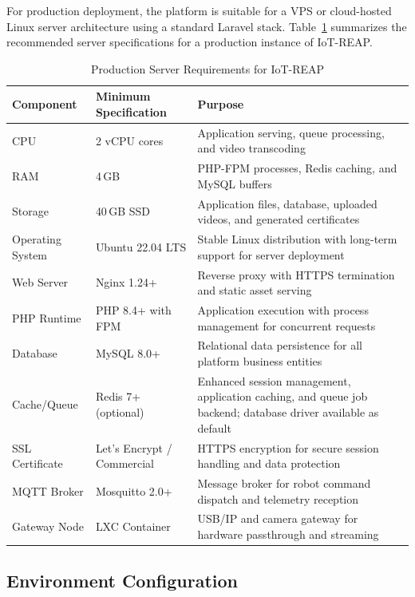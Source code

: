 For production deployment, the platform is suitable for a VPS or cloud-hosted Linux server architecture using a standard Laravel stack. Table~\ref{tab:production-requirements} summarizes the recommended server specifications for a production instance of IoT-REAP.

\begin{table}[H]
\centering
\caption{Production Server Requirements for IoT-REAP}
\label{tab:production-requirements}
\begin{tabular}{|p{4cm}|p{4cm}|p{6.5cm}|}
\hline
\textbf{Component} & \textbf{Minimum Specification} & \textbf{Purpose} \\
\hline
CPU & 2 vCPU cores & Application serving, queue processing, and video transcoding \\
\hline
RAM & 4\,GB & PHP-FPM processes, Redis caching, and MySQL buffers \\
\hline
Storage & 40\,GB SSD & Application files, database, uploaded videos, and generated certificates \\
\hline
Operating System & Ubuntu 22.04 LTS & Stable Linux distribution with long-term support for server deployment \\
\hline
Web Server & Nginx 1.24+ & Reverse proxy with HTTPS termination and static asset serving \\
\hline
PHP Runtime & PHP 8.4+ with FPM & Application execution with process management for concurrent requests \\
\hline
Database & MySQL 8.0+ & Relational data persistence for all platform business entities \\
\hline
Cache/Queue & Redis 7+ (optional) & Enhanced session management, application caching, and queue job backend; database driver available as default \\
\hline
SSL Certificate & Let's Encrypt / Commercial & HTTPS encryption for secure session handling and data protection \\
\hline
MQTT Broker & Mosquitto 2.0+ & Message broker for robot command dispatch and telemetry reception \\
\hline
Gateway Node & LXC Container & USB/IP and camera gateway for hardware passthrough and streaming \\
\hline
\end{tabular}
\end{table}

\subsection{Environment Configuration}

